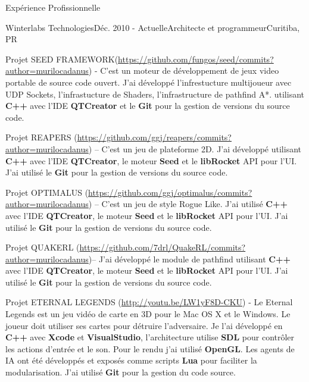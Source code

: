 \documentclass{resume}
\begin{document}
  \begin{rSection}{Expérience Profissionnelle}
    \begin{rSubsection}{Winterlabs Technologies}{Déc. 2010 - 
Actuelle}{Architecte et programmeur}{Curitiba, PR}
    \item Projet SEED FRAMEWORK(\url{https://github.com/fungos/seed/commits?author=murilocadanus}) - C'est un moteur de développement de jeux video portable de source code ouvert. J'ai développé l'infrestucture multijoueur avec UDP Sockets, l'infrastucture de Shaders, l'infrastructure de pathfind A*. utilisant \textbf{C++} avec l'IDE \textbf{QTCreator} et le \textbf{Git} pour la gestion de versions du source code. \\
    \item Projet REAPERS (\url{https://github.com/ggj/reapers/commits?author=murilocadanus}) – C'est un jeu de plateforme 2D. J'ai développé utilisant \textbf{C++} avec l'IDE \textbf{QTCreator}, le moteur \textbf{Seed} et le \textbf{libRocket} API pour l'UI.  J'ai utilisé le \textbf{Git} pour la gestion de versions du source code. \\
    \item Projet OPTIMALUS (\url{https://github.com/ggj/optimalus/commits?author=murilocadanus}) – C'est un jeu de style Rogue Like. J'ai utilisé \textbf{C++} avec l'IDE \textbf{QTCreator}, le moteur \textbf{Seed} et le \textbf{libRocket} API pour l'UI.  J'ai utilisé le \textbf{Git} pour la gestion de versions du source code. \\
    \item Projet QUAKERL (\url{https://github.com/7drl/QuakeRL/commits?author=murilocadanus})– J'ai développé le module de pathfind utilisant \textbf{C++} avec l'IDE \textbf{QTCreator}, le moteur \textbf{Seed} et le \textbf{libRocket} API pour l'UI.  J'ai utilisé le \textbf{Git} pour la gestion de versions du source code. \\
    \item Projet ETERNAL LEGENDS (\url{http://youtu.be/LW1yF8D-CKU}) - Le Eternal Legends est un jeu vidéo de carte en 3D pour le Mac OS X et le Windows. Le joueur doit utiliser ses cartes pour détruire l'adversaire. Je l’ai développé en \textbf{C++} avec \textbf{Xcode} et \textbf{VisualStudio}, l’architecture utilise \textbf{SDL} pour contrôler les actions d’entrée et le son. Pour le rendu j’ai utilisé \textbf{OpenGL}. Les agents de IA ont été développés et exposés comme scripts \textbf{Lua} pour faciliter la modularisation. J’ai utilisé \textbf{Git} pour la gestion du code source. \\

\end{rSubsection}
\end{rSection}
\end{document}

